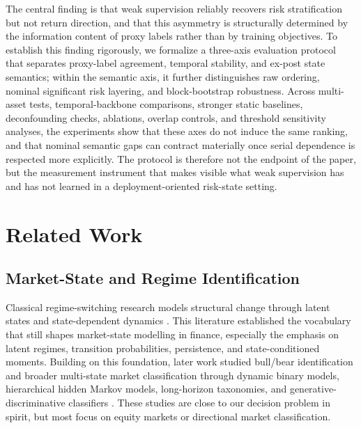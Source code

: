 \documentclass[a4paper,fleqn]{cas-dc}
\begin{document}
The central finding is that weak supervision reliably recovers risk stratification but not return direction, and that this asymmetry is structurally determined by the information content of proxy labels rather than by training objectives. To establish this finding rigorously, we formalize a three-axis evaluation protocol that separates proxy-label agreement, temporal stability, and ex-post state semantics; within the semantic axis, it further distinguishes raw ordering, nominal significant risk layering, and block-bootstrap robustness. Across multi-asset tests, temporal-backbone comparisons, stronger static baselines, deconfounding checks, ablations, overlap controls, and threshold sensitivity analyses, the experiments show that these axes do not induce the same ranking, and that nominal semantic gaps can contract materially once serial dependence is respected more explicitly. The protocol is therefore not the endpoint of the paper, but the measurement instrument that makes visible what weak supervision has and has not learned in a deployment-oriented risk-state setting.

\section{Related Work}
\subsection{Market-State and Regime Identification}
Classical regime-switching research models structural change through latent states and state-dependent dynamics \cite{hamilton1989nonstationary,rabiner1989hmm,ang2012regime,mamon2007hmmfinance}. This literature established the vocabulary that still shapes market-state modelling in finance, especially the emphasis on latent regimes, transition probabilities, persistence, and state-conditioned moments. Building on this foundation, later work studied bull/bear identification and broader multi-state market classification through dynamic binary models, hierarchical hidden Markov models, long-horizon taxonomies, and generative-discriminative classifiers \cite{nyberg2013bearbull,oelschlager2023bullbear,wang2021bearbull,koukorinis2025regime}. These studies are close to our decision problem in spirit, but most focus on equity markets or directional market classification.
\end{document}

